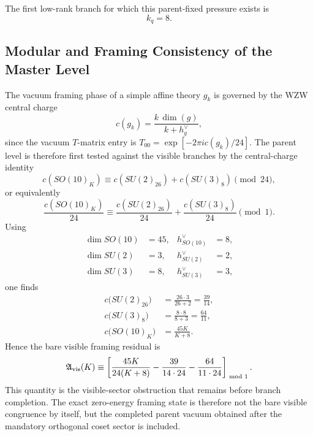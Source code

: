 \documentclass[11pt]{article}
\begin{document}
The first low-rank branch for which this parent-fixed pressure exists is
\begin{equation}
 \boxed{k_q=8.}
\end{equation}

\subsection{Modular and Framing Consistency of the Master Level}

The vacuum framing phase of a simple affine theory $g_k$ is governed by the WZW central charge
\begin{equation}
 c(g_k)=\frac{k\,\dim(g)}{k+h_g^{\vee}},
 \label{eq:central-charge-wzw}
\end{equation}
since the vacuum $T$-matrix entry is $T_{00}=\exp[-2\pi i c(g_k)/24]$. The parent level is therefore first tested against the visible branches by the central-charge identity
\begin{equation}
 c(SO(10)_K)
 \equiv
 c(SU(2)_{26}) + c(SU(3)_8)
 \pmod{24},
 \label{eq:master-level-central-charge}
\end{equation}
or equivalently
\begin{equation}
 \frac{c(SO(10)_K)}{24}
 \equiv
 \frac{c(SU(2)_{26})}{24} + \frac{c(SU(3)_8)}{24}
 \pmod 1.
 \label{eq:master-level-modularity}
\end{equation}
Using
\begin{align}
 \dim SO(10)&=45,
 & h^{\vee}_{SO(10)}&=8, \\
 \dim SU(2)&=3,
 & h^{\vee}_{SU(2)}&=2, \\
 \dim SU(3)&=8,
 & h^{\vee}_{SU(3)}&=3,
\end{align}
one finds
\begin{align}
 c\bigl(SU(2)_{26}\bigr)
 &= \frac{26\cdot3}{26+2}
 = \frac{39}{14}, \\
 c\bigl(SU(3)_8\bigr)
 &= \frac{8\cdot8}{8+3}
 = \frac{64}{11}, \\
 c\bigl(SO(10)_K\bigr)
 &= \frac{45K}{K+8}.
\end{align}
Hence the bare visible framing residual is
\begin{equation}
 \mathfrak A_{\rm vis}(K)
 \equiv
 \left[\frac{45K}{24(K+8)} - \frac{39}{14\cdot24} - \frac{64}{11\cdot24}\right]_{\!\!\mod 1}.
\end{equation}
This quantity is the visible-sector obstruction that remains before branch completion. The exact zero-energy framing state is therefore not the bare visible congruence by itself, but the completed parent vacuum obtained after the mandatory orthogonal coset sector is included.
\end{document}

